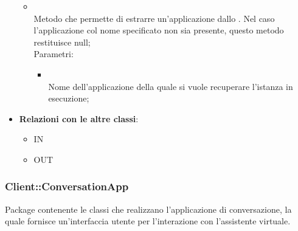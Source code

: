 \begin{itemize}
\begin{itemize}
		\item[]  \\		Metodo che permette di estrarre un'applicazione dallo . Nel caso l'applicazione col nome specificato non sia presente, questo metodo restituisce null;\\
		Parametri:
		\begin{itemize}
			\item {} \\
			Nome dell'applicazione della quale si vuole recuperare l'istanza in esecuzione;
		\end{itemize}
	\end{itemize}
	\item \textbf{Relazioni con le altre classi}:
	\begin{itemize}
		\item IN \hyperlink{Manager_label}{}
		\item OUT \hyperlink{Application_label}{}
	\end{itemize}
\end{itemize}
\FloatBarrier

\subsubsection{Client::ConversationApp}
Package contenente le classi che realizzano l'applicazione di conversazione, la quale fornisce un'interfaccia utente per l'interazione con l'assistente virtuale.
